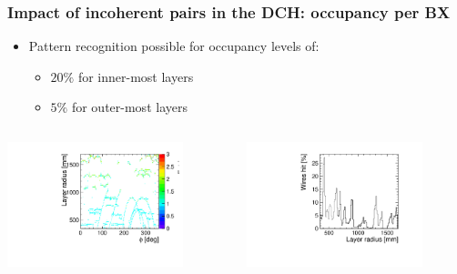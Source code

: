 \documentclass[aspectratio=169, hyperref={colorlinks=true,pdfpagelabels=false,linkcolor=black}, xcolor=dvipsnames,10pt]{beamer}
\begin{document}
\begin{frame}
	\frametitle{Impact of incoherent pairs in the DCH: occupancy
          per BX}

        \begin{itemize}
        \item Pattern recognition possible for occupancy levels of:
          \begin{itemize}
          \item $20\%$ for inner-most layers
          \item $5\%$ for outer-most layers
          \end{itemize}
        \end{itemize}

	\vspace{-0.1cm}
	\begin{columns}[t]
	\centering
	\includegraphics[width=0.8\textwidth]{../figures/layerR_vs_phi.pdf}


	\centering
	\includegraphics[width=0.8\textwidth]{../figures/layerR_vs_wires_percent.pdf}	
	\end{columns}


\end{frame}
\end{document}
